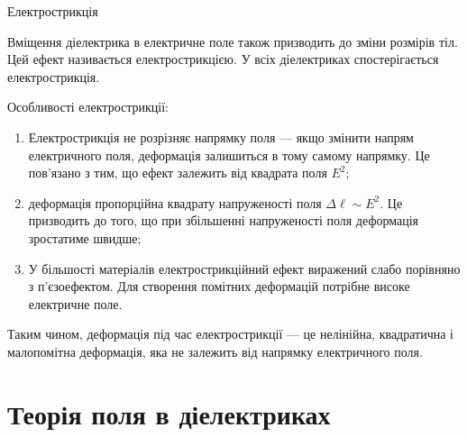 \documentclass[]{beamer}
\begin{document}
\begin{frame}{Електрострикція}{}
	\begin{block}{}\justifying
		Вміщення діелектрика в електричне поле також призводить до \alert{зміни розмірів тіл}. Цей
		ефект називається  \alert{електрострикцією}. У всіх діелектриках спостерігається
		електрострикція.
	\end{block}

	\begin{block}{}\justifying\footnotesize
		Особливості електрострикції:
		\begin{enumerate}
			\item Електрострикція не розрізняє напрямку поля --- якщо змінити напрям електричного поля,
			      деформація залишиться в тому самому напрямку. Це пов'язано з тим, що ефект залежить від
			      квадрата
			      поля $E^2$;
			\item деформація  пропорційна квадрату напруженості поля $\Delta \ell \sim E^2$. Це призводить
			      до
			      того, що при збільшенні напруженості поля деформація зростатиме швидше;
			\item У більшості матеріалів електрострикційний ефект виражений слабо порівняно з п'єзоефектом.
			      Для
			      створення помітних деформацій потрібне високе електричне поле.
		\end{enumerate}
		Таким чином, деформація під час електрострикції --- це нелінійна, квадратична і малопомітна
		деформація, яка не залежить від напрямку електричного поля.
	\end{block}

\end{frame}

\section{Теорія поля в діелектриках}
\end{document}
